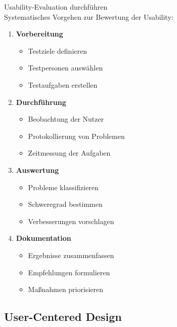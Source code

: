 \begin{KR}{Usability-Evaluation durchführen}\\
Systematisches Vorgehen zur Bewertung der Usability:

\begin{enumerate}
    \item \textbf{Vorbereitung}
    \begin{itemize}
        \item Testziele definieren
        \item Testpersonen auswählen
        \item Testaufgaben erstellen
    \end{itemize}
    
    \item \textbf{Durchführung}
    \begin{itemize}
        \item Beobachtung der Nutzer
        \item Protokollierung von Problemen
        \item Zeitmessung der Aufgaben
    \end{itemize}
    
    \item \textbf{Auswertung}
    \begin{itemize}
        \item Probleme klassifizieren
        \item Schweregrad bestimmen
        \item Verbesserungen vorschlagen
    \end{itemize}
    
    \item \textbf{Dokumentation}
    \begin{itemize}
        \item Ergebnisse zusammenfassen
        \item Empfehlungen formulieren
        \item Maßnahmen priorisieren
    \end{itemize}
\end{enumerate}
\end{KR}

\subsection{User-Centered Design}

